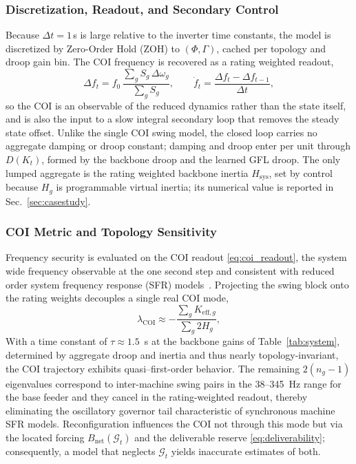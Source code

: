 \documentclass[lettersize,journal]{IEEEtran}
\begin{document}
	\subsubsection{Discretization, Readout, and Secondary Control}
	Because $\Delta t=1$\,s is large relative to the inverter time constants, the model is discretized by Zero-Order Hold (ZOH) to $(\Phi,\Gamma)$, cached per topology and droop gain bin. The COI frequency is recovered as a rating weighted readout,
	\begin{equation}
		\Delta f_t = f_0\,\frac{\sum_g S_g\,\Delta\omega_g}{\sum_g S_g},
		\qquad
		\dot f_t = \frac{\Delta f_t-\Delta f_{t-1}}{\Delta t},
		\label{eq:coi_readout}
	\end{equation}
	so the COI is an observable of the reduced dynamics rather than the state itself, and is also the input to a slow integral secondary loop that removes the steady state offset. Unlike the single COI swing model, the closed loop carries no aggregate damping or droop constant; damping and droop enter per unit through $D(K_t)$, formed by the backbone droop and the learned GFL droop. The only lumped aggregate is the rating weighted backbone inertia $H_{\mathrm{sys}}$, set by control because $H_g$ is programmable virtual inertia; its numerical value is reported in Sec.~\ref{sec:casestudy}.
	
	\subsubsection{COI Metric and Topology Sensitivity}
	Frequency security is evaluated on the COI readout \eqref{eq:coi_readout}, the system wide frequency observable at the one second step and consistent with reduced order system frequency response (SFR) models~\cite{8336919}. Projecting the swing block onto the rating weights decouples a single real COI mode,
	\begin{equation}
		\lambda_{\mathrm{COI}}\approx-\frac{\sum_g K_{\mathrm{eff},g}}{\sum_g 2H_g},
		\label{eq:coi_mode}
	\end{equation}
	With a time constant of $\tau \approx 1.5$~s at the backbone gains of Table~\ref{tab:system}, determined by aggregate droop and inertia and thus nearly topology-invariant, the COI trajectory exhibits quasi–first-order behavior. The remaining $2(n_g-1)$ eigenvalues correspond to inter-machine swing pairs in the 38--345~Hz range for the base feeder and they cancel in the rating-weighted readout, thereby eliminating the oscillatory governor tail characteristic of synchronous machine SFR models. Reconfiguration influences the COI not through this mode but via the located forcing $B_{\mathrm{net}}(\mathcal{G}_t)$ and the deliverable reserve \eqref{eq:deliverability}; consequently, a model that neglects $\mathcal{G}_t$ yields inaccurate estimates of both.
	
\end{document}
